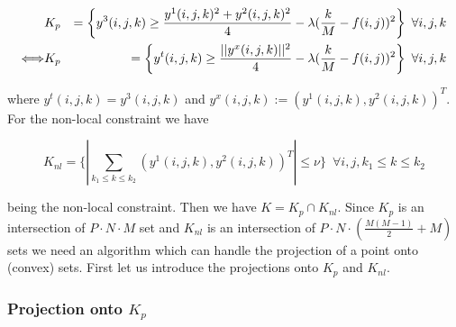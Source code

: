             \begin{eqnarray}
                &K_{p}& = \bigg\{ y^{3}(i,j,k) \ge \frac{y^{1}(i,j,k)^{2} + y^{2}(i,j,k)^{2}}{4} - \lambda(\frac{k}{M} - f(i,j))^{2} \bigg\} \,\,\, \forall i, j, k \notag \\
                \Longleftrightarrow &K_{p}& = \bigg\{ y^{t}(i, j, k) \ge \frac{||y^{x}(i, j, k)||^{2}}{4} - \lambda(\frac{k}{M} - f(i,j))^{2} \bigg\} \,\,\, \forall i, j, k \label{eq:parabola}
            \end{eqnarray}

            where $y^{t}(i, j, k) = y^{3}(i, j, k)$ and $y^{x}(i, j, k) := (y^{1}(i, j, k), y^{2}(i, j, k))^{T}$. For the non-local constraint we have

            \begin{equation}
                K_{nl} = \bigg\{ \left| \sum_{k_{1} \le k \le k_{2}} (y^{1}(i,j,k), y^{2}(i,j,k))^{T} \right| \le \nu \bigg\} \,\,\, \forall i, j, k_{1} \le k \le k_{2} \label{eq:nonlocal}
            \end{equation}

            being the non-local constraint. Then we have $K = K_{p} \cap K_{nl}$. Since $K_{p}$ is an intersection of $P \cdot N \cdot M$ set and $K_{nl}$ is an intersection of $P \cdot N \cdot (\frac{M(M-1)}{2} + M)$ sets we need an algorithm which can handle the projection of a point onto (convex) sets. First let us introduce the projections onto $K_{p}$ and $K_{nl}$.

            \subsubsection{Projection onto $K_{p}$}

